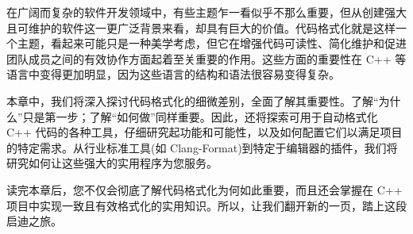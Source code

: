 在广阔而复杂的软件开发领域中，有些主题乍一看似乎不那么重要，但从创建强大且可维护的软件这一更广泛背景来看，却具有巨大的价值。代码格式化就是这样一个主题，看起来可能只是一种美学考虑，但它在增强代码可读性、简化维护和促进团队成员之间的有效协作方面起着至关重要的作用。这些方面的重要性在 C++ 等语言中变得更加明显，因为这些语言的结构和语法很容易变得复杂。

本章中，我们将深入探讨代码格式化的细微差别，全面了解其重要性。了解“为什么”只是第一步；了解“如何做”同样重要。因此，还将探索可用于自动格式化 C++ 代码的各种工具，仔细研究起功能和可能性，以及如何配置它们以满足项目的特定需求。从行业标准工具(如 Clang-Format)到特定于编辑器的插件，我们将研究如何让这些强大的实用程序为您服务。

读完本章后，您不仅会彻底了解代码格式化为何如此重要，而且还会掌握在 C++ 项目中实现一致且有效格式化的实用知识。所以，让我们翻开新的一页，踏上这段启迪之旅。
